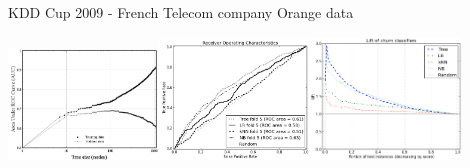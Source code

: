 
KDD Cup 2009 - French Telecom company Orange data

  \includegraphics[width=0.3\textwidth]{8-8_nocap.png}\hspace{0.02\textwidth}\includegraphics[width=0.3\textwidth]{8-9_nocap.png}\hspace{0.02\textwidth}\includegraphics[width=0.3\textwidth]{8-10_nocap.png}

